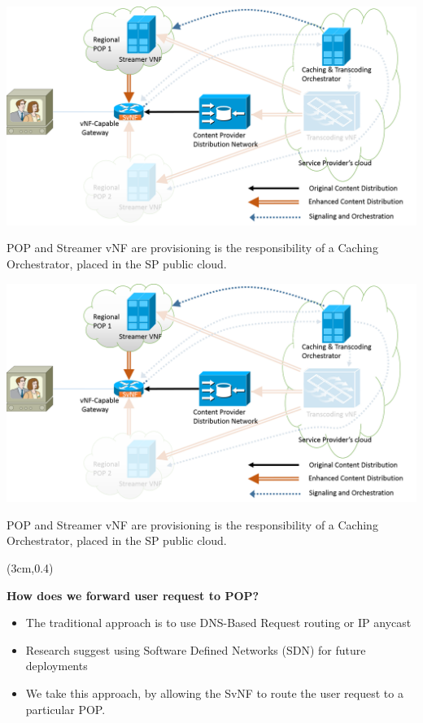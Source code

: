 \documentclass[a4paper]{beamer}
\begin{document}
\begin{frame}[plain,T]{}
	\centering
	\includegraphics[width=0.95\linewidth]{highleveldesign3.png}
	\vspace{2em}
	\begin{block}{}
		POP and Streamer vNF are provisioning is the responsibility of a Caching Orchestrator, placed in the SP public cloud.
	\end{block}
\end{frame}

\begin{frame}[plain,T]{}
	\centering
	\includegraphics[width=0.95\linewidth]{highleveldesign3.png}
	\vspace{2em}
	\begin{block}{}
		POP and Streamer vNF are provisioning is the responsibility of a Caching Orchestrator, placed in the SP public cloud.
	\end{block}
		\begin{textblock*}{8cm}(3cm,0.4\textheight)
		\begin{alertblock}{}
			\textbf{ How does we forward user request to POP? }
			\begin{itemize}
				\item The traditional approach is to use DNS-Based Request routing or IP anycast
				\item Research suggest using Software Defined Networks (SDN) for future deployments
				\item We take this approach, by allowing the SvNF to route the user request to a particular POP.
			\end{itemize}
		\end{alertblock}
	\end{textblock*}		
\end{frame}
\end{document}
